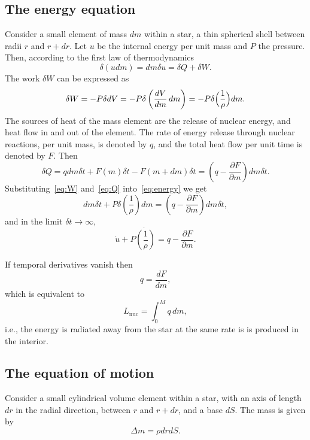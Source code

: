 \documentclass[]{article}
\newcommand{\di}{\partial} %
\begin{document}
\subsection{The energy equation}
Consider a small element of mass $dm$ within a star, a thin spherical shell
between radii $r$ and $r+dr$. Let $u$ be the internal energy per unit mass and
$P$ the pressure. Then, according to the first law of thermodynamics
\begin{equation}\label{eq:energy}
\delta(udm) = dm\delta{u} = \delta{Q} + \delta{W}.
\end{equation}
The work $\delta{W}$ can be expressed as
\begin{equation}\label{eq:W}
\delta{W} = -P\delta{d}V = -P\delta\left(\frac{dV}{dm}\,dm\right) =
-P\delta\Bigl(\frac{1}{\rho}\Bigr)dm.
\end{equation}
The sources of heat of the mass element are the release of nuclear energy, and
heat flow in and out of the element. The rate of energy release through nuclear
reactions, per unit mass, is denoted by $q$, and the total heat flow per unit
time is denoted by $F$. Then
\begin{equation}\label{eq:Q}
\delta{Q} = qdm\delta{t} + F(m)\delta{t} - F(m+dm)\delta{t} =
\left(q - \frac{\di{F}}{\di{m}}\right)dm\delta{t}.
\end{equation}
Substituting~\eqref{eq:W} and~\eqref{eq:Q} into~\eqref{eq:energy} we get
\begin{equation}
dm\delta{t} + P\delta\left(\frac{1}{\rho}\right)dm =
\left(q - \frac{\di{F}}{\di{m}}\right)dm\delta{t},
\end{equation}
and in the limit $\delta{t}\to\infty$,
\begin{equation}\label{eq:energy2}
\dot{u} + P\dot{\left(\frac{1}{\rho}\right)} = q - \frac{\di{F}}{\di{m}}.
\end{equation}

If temporal derivatives vanish then
\begin{equation}
q = \frac{dF}{dm},
\end{equation}
which is equivalent to
\begin{equation}
L_\text{nuc} = \int_0^Mq\,dm,
\end{equation}
i.e., the energy is radiated away from the star at the same rate is is produced
in the interior.

\subsection{The equation of motion}
Consider a small cylindrical volume element within a star, with an axis of
length $dr$ in the radial direction, between $r$ and $r+dr$, and a base $dS$.
The mass is given by
\begin{equation}\label{eq:delem}
\Delta{m} = \rho{d}rdS.
\end{equation}
\end{document}

